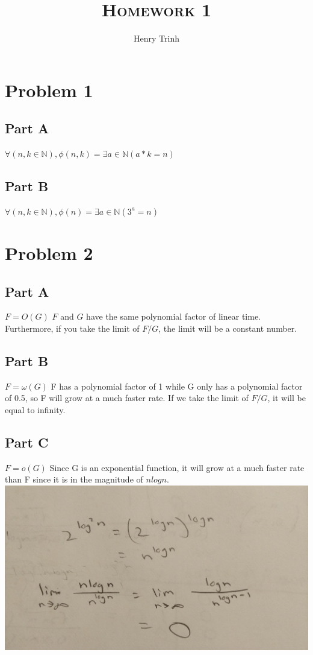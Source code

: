 \documentclass[12pt]{article}
\title{\textsc{Homework 1}}
\author{Henry Trinh}
\begin{document}
\maketitle

\newpage %
\section*{Problem 1}
\subsection*{Part A}
$\forall (n, k \in \mathbb{N}), \phi(n,k) = \exists a \in \mathbb{N} (a * k = n)$
\subsection*{Part B}
$\forall (n, k \in \mathbb{N}), \phi(n) = \exists a \in \mathbb{N} (3^a = n)$

\newpage
\section*{Problem 2}
\subsection*{Part A}
$F=O(G)$
\newline
\newline
$F$ and $G$ have the same polynomial factor of linear time. Furthermore, if you take the limit 
of $F/G$, the limit will be a constant number.
\subsection*{Part B}
$F=\omega(G)$
\newline
\newline
F has a polynomial factor of 1 while G only has a polynomial factor of 0.5, so 
F will grow at a much faster rate. If we take the limit of $F/G$, it will be equal 
to infinity.
\subsection*{Part C}
$F=o(G)$
\newline
\newline
Since G is an exponential function, it will grow at a much faster rate than F since it is in the magnitude of 
$nlogn$.
\newline
\newline
\includegraphics[scale=0.1, angle=0]{problem2c.jpeg}
\newline
\end{document}
